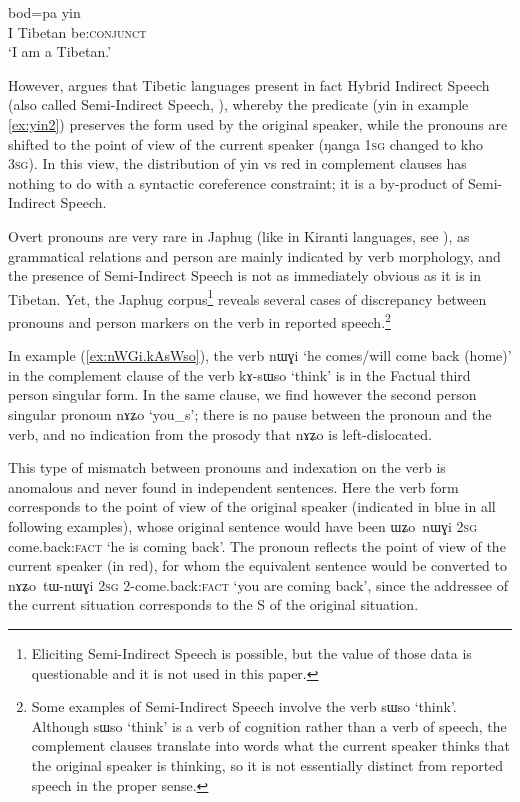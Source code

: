 \documentclass[oldfontcommands,oneside,a4paper,11pt]{article}
\newcommand{\ipa}[1]{{\phon \mbox{#1}}} %
\newcommand{\refb}[1]{(\ref{#1})}
\begin{document}
\begin{exe}
\ex \label{ex:yin3}
\gll     	\ipa{nga} 	\ipa{bod=pa} 	\ipa{yin} 	  \\
I Tibetan be:\textsc{conjunct}    \\
\glt `I am a Tibetan.'
   \end{exe}
   
However,  \citet{tournadre08conjunct} argues that Tibetic languages present in fact Hybrid Indirect Speech (also called Semi-Indirect Speech, \citealt{aikhenvald08semidirect}), whereby the predicate (\ipa{yin} in example \ref{ex:yin2}) preserves the form used by the original speaker, while the pronouns are shifted to the point of view of the current speaker (\ipa{ŋanga} \textsc{1sg} changed to \ipa{kho} \textsc{3sg}). In this view, the distribution of \ipa{yin} vs \ipa{red} in complement clauses has nothing to do with a syntactic coreference constraint; it is a by-product of Semi-Indirect Speech.

Overt pronouns are very rare in Japhug (like in Kiranti languages, see \citealt{bickel01deictic}), as grammatical relations and person are mainly indicated by verb morphology, and the presence of Semi-Indirect Speech is not as immediately obvious as it is in Tibetan. Yet, the Japhug corpus\footnote{Eliciting Semi-Indirect Speech is possible, but the value of those data is questionable and  it is not used in this paper.} reveals several cases of discrepancy between pronouns and person markers on the verb in reported speech.\footnote{Some examples of Semi-Indirect Speech involve the verb \ipa{sɯso} `think'. Although  \ipa{sɯso} `think' is a verb of cognition rather than a verb of speech, the complement clauses translate into words what the current speaker thinks that the original speaker is thinking, so it is not essentially distinct from reported speech in the proper sense.}


In example \refb{ex:nWGi.kAsWso}, the verb \ipa{nɯɣi} `he comes/will come back (home)' in the complement clause of the verb \ipa{kɤ-sɯso} `think' is in the Factual third person singular form. In the same clause, we find however the second person singular pronoun \ipa{nɤʑo} `you_s'; there is no pause between the pronoun and the verb, and no indication from the prosody that \ipa{nɤʑo} is left-dislocated. 

This type of mismatch  between pronouns and indexation on the verb is anomalous and never found in independent sentences. Here the verb form corresponds to the point of view of the original speaker (indicated in blue in all following examples), whose original sentence would have been \ipa{ɯʑo nɯɣi} \textsc{2sg} {come.back:\textsc{fact}} `he is coming back'. The pronoun reflects the point of view of the current speaker (in red), for whom the equivalent sentence would be converted to \ipa{nɤʑo tɯ-nɯɣi} \textsc{2sg} {2-come.back:\textsc{fact}} `you are coming back', since the addressee of the current situation corresponds to the S of the original situation.
\end{document}
